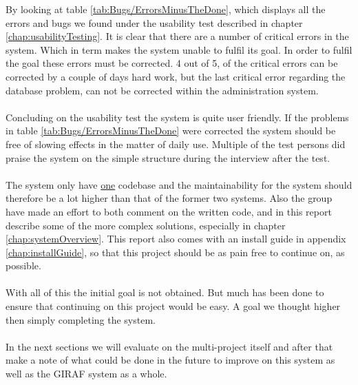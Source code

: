 By looking at table \ref{tab:Bugs/ErrorsMinusTheDone}, which displays all the errors and bugs we found under the usability test described in chapter \vref{chap:usabilityTesting}. It is clear that there are a number of critical errors in the system. Which in term makes the system unable to fulfil its goal. In order to fulfil the goal these errors must be corrected.
4 out of 5, of the critical errors can be corrected by a couple of days hard work, but the last critical error regarding the database problem, can not be corrected within the administration system.\\
\\
Concluding on the usability test the system is quite user friendly. If the problems in table \ref{tab:Bugs/ErrorsMinusTheDone} were corrected the system should be free of slowing effects in the matter of daily use. Multiple of the test persons did praise the system on the simple structure during the interview after the test.\\
\\
The system only have \underline{one} codebase and the maintainability for the system should therefore be a lot higher than that of the former two systems. Also the group have made an effort to both comment on the written code, and in this report describe some of the more complex solutions, especially in chapter \vref{chap:systemOverview}. This report also comes with an install guide in appendix \vref{chap:installGuide}, so that this project should be as pain free to continue on, as possible.\\
\\
With all of this the initial goal is not obtained. But much has been done to ensure that continuing on this project would be easy. A goal we thought higher then simply completing the system.\\
\\
In the next sections we will evaluate on the multi-project itself and after that make a note of what could be done in the future to improve on this system as well as the GIRAF system as a whole.
